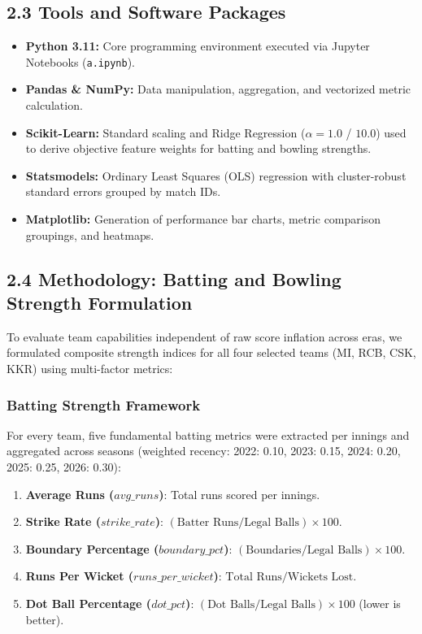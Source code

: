 \documentclass[11pt,a4paper]{article}
\begin{document}
\subsection*{2.3 Tools and Software Packages}
\begin{itemize}
    \item \textbf{Python 3.11:} Core programming environment executed via Jupyter Notebooks (\texttt{a.ipynb}).
    \item \textbf{Pandas \& NumPy:} Data manipulation, aggregation, and vectorized metric calculation.
    \item \textbf{Scikit-Learn:} Standard scaling and Ridge Regression ($\alpha = 1.0$ / $10.0$) used to derive objective feature weights for batting and bowling strengths.
    \item \textbf{Statsmodels:} Ordinary Least Squares (OLS) regression with cluster-robust standard errors grouped by match IDs.
    \item \textbf{Matplotlib:} Generation of performance bar charts, metric comparison groupings, and heatmaps.
\end{itemize}

\subsection*{2.4 Methodology: Batting and Bowling Strength Formulation}
To evaluate team capabilities independent of raw score inflation across eras, we formulated composite strength indices for all four selected teams (MI, RCB, CSK, KKR) using multi-factor metrics:

\subsubsection*{Batting Strength Framework}
For every team, five fundamental batting metrics were extracted per innings and aggregated across seasons (weighted recency: 2022: 0.10, 2023: 0.15, 2024: 0.20, 2025: 0.25, 2026: 0.30):
\begin{enumerate}
    \item \textbf{Average Runs ($avg\_runs$)}: Total runs scored per innings.
    \item \textbf{Strike Rate ($strike\_rate$)}: $(\text{Batter Runs} / \text{Legal Balls}) \times 100$.
    \item \textbf{Boundary Percentage ($boundary\_pct$)}: $(\text{Boundaries} / \text{Legal Balls}) \times 100$.
    \item \textbf{Runs Per Wicket ($runs\_per\_wicket$)}: $\text{Total Runs} / \text{Wickets Lost}$.
    \item \textbf{Dot Ball Percentage ($dot\_pct$)}: $(\text{Dot Balls} / \text{Legal Balls}) \times 100$ (lower is better).
\end{enumerate}
\end{document}
